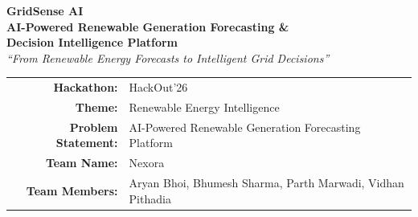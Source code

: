 \documentclass[11pt,a4paper]{article}
\begin{document}
\begin{titlepage}
    \centering
    \vspace*{1.5cm}
    
    {\Huge \textbf{\color{primaryNavy}GridSense AI}}\\[0.6em]
    {\Large \textbf{\color{accentTeal}AI-Powered Renewable Generation Forecasting \&\\Decision Intelligence Platform}}\\[1.2em]
    
    {\large \textit{\color{darkSlate}``From Renewable Energy Forecasts to Intelligent Grid Decisions''}}\\[2.0cm]


    \vspace{2.2cm}

    \begin{tabularx}{0.85\textwidth}{r Y}
        \textbf{\color{primaryNavy}Hackathon:} & HackOut'26 \\
        \addlinespace[0.6em]
        \textbf{\color{primaryNavy}Theme:} & Renewable Energy Intelligence \\
        \addlinespace[0.6em]
        \textbf{\color{primaryNavy}Problem Statement:} & AI-Powered Renewable Generation Forecasting Platform \\
        \addlinespace[0.6em]
        \textbf{\color{primaryNavy}Team Name:} & Nexora \\
        \addlinespace[0.6em]
        \textbf{\color{primaryNavy}Team Members:} & Aryan Bhoi, Bhumesh Sharma, Parth Marwadi, Vidhan Pithadia \\
      
    \end{tabularx}

    \vfill

 
    \vspace*{1.0cm}
\end{titlepage}

\setcounter{page}{1}
\end{document}
